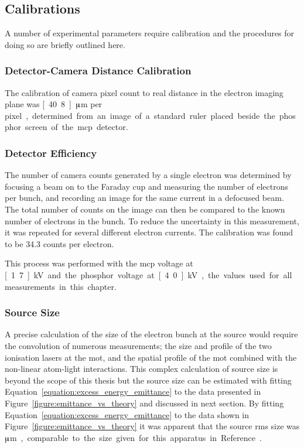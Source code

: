\subsection{Calibrations}
A number of experimental parameters require calibration and the procedures for doing so are briefly outlined here.

\subsubsection{Detector-Camera Distance Calibration}
The calibration of camera pixel count to real distance in the electron imaging plane was \unit[40.8]{$\muup$m per pixel}, determined from an image of a standard ruler placed beside the phosphor screen of the \gls{mcp} detector.

\subsubsection{Detector Efficiency}
The number of camera counts generated by a single electron was determined by focusing a beam on to the Faraday cup and measuring the number of electrons per bunch, and recording an image for the same current in a defocused beam.
The total number of counts on the image can then be compared to the known number of electrons in the bunch.
To reduce the uncertainty in this measurement, it was repeated for several different electron currents.
The calibration was found to be 34.3 counts per electron.

This process was performed with the \gls{mcp} voltage at \unit[1.7]{kV} and the phosphor voltage at \unit[4.0]{kV}, the values used for all measurements in this chapter.

\subsubsection{Source Size}
A precise calculation of the size of the electron bunch at the source would require the convolution of numerous measurements; the size and profile of the two ionisation lasers at the \gls{mot}, and the spatial profile of the \gls{mot} combined with the non-linear atom-light interactions.
This complex calculation of source size is beyond the scope of this thesis but the source size can be estimated with fitting Equation~\ref{equation:excess_energy_emittance} to the data presented in Figure~\ref{figure:emittance_vs_theory} and discussed in next section.
By fitting Equation~\ref{equation:excess_energy_emittance} to the data shown in Figure~\ref{figure:emittance_vs_theory} it was apparent that the source \gls{rms} size was \unit[340]{$\muup$m}, comparable to the size given for this apparatus in Reference~\cite{speirs_single-shot_2015}.

